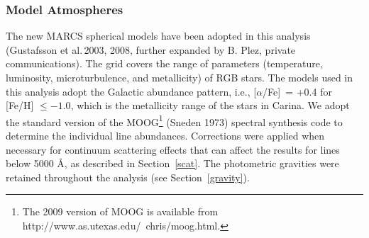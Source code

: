 \documentclass{emulateapj}
\newcommand\afe{[$\alpha$/Fe] \,}
\newcommand\etal{{\rm et al.\,}}
\begin{document}
\subsubsection{Model Atmospheres}

The new MARCS spherical models have been adopted in this analysis
(Gustafsson \etal  2003, 2008, further expanded by B. Plez, private
communications).
The grid covers the range of parameters (temperature, luminosity,
microturbulence, and metallicity) of RGB stars.  
The models used in this analysis 
adopt the Galactic abundance pattern, 
i.e., \afe = +0.4 for [Fe/H] $\le -1.0$, 
which is the metallicity range of the stars in Carina.
%
We adopt the standard version of the 
MOOG\footnote{The 2009 version of MOOG is available from http://www.as.utexas.edu/~chris/moog.html.}
(Sneden 1973) spectral synthesis code to determine the individual line
abundances.   Corrections were applied when necessary for continuum 
scattering effects that can affect the results for lines below 5000 \AA,
as described in Section~\ref{scat}.
%
The photometric gravities were 
retained throughout the analysis (see Section~\ref{gravity}). 
\end{document}
